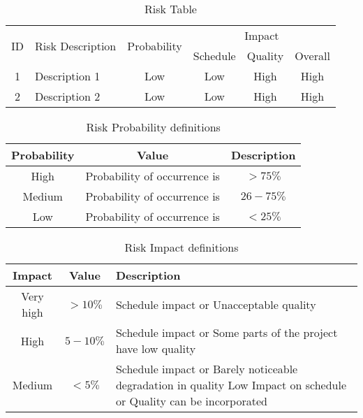 \documentclass[oneside,a4paper,12pt]{report}
\begin{document}
\begin{table}[!htbp]
\begin{center}
\def\arraystretch{1.5}
\begin{tabularx}{\textwidth}{| c | X | c | c | c | c |}
\hline
\multirow{2}{*}{ID} & \multirow{2}{*}{Risk Description}	& \multirow{2}{*}{Probability} & \multicolumn{3}{|c|}{Impact} \\ \cline{4-6}
	& & &	Schedule	& Quality	& Overall \\ \hline
1	& Description 1	& Low	& Low	& High	& High \\ \hline
2	& Description 2	& Low	& Low	& High	& High \\ \hline
\end{tabularx}
\end{center}
\caption{Risk Table}
\label{tab:risk}
\end{table}


\begin{table}[!htbp]
\begin{center}
\def\arraystretch{1.5}
\begin{tabular}{| c | c | c |}
\hline
Probability & Value &	Description \\ \hline
High &	Probability of occurrence is &  $ > 75 \% $ \\ \hline
Medium &	Probability of occurrence is  & $26-75 \% $ \\ \hline
Low	& Probability of occurrence is & $ < 25 \% $ \\ \hline
\end{tabular}
\end{center}
\caption{Risk Probability definitions \cite{bookPressman}}
\label{tab:riskdef}
\end{table}

\begin{table}[!htbp]
\begin{center}
\def\arraystretch{1.5}
\begin{tabularx}{\textwidth}{| c | c | X |}
\hline
Impact & Value	& Description \\ \hline
Very high &	$> 10 \%$ & Schedule impact or Unacceptable quality \\ \hline
High &	$5-10 \%$ & Schedule impact or Some parts of the project have low quality \\ \hline
Medium	& $ < 5 \% $ & Schedule impact or Barely noticeable degradation in quality Low	Impact on schedule or Quality can be incorporated \\ \hline
\end{tabularx}
\end{center}
\caption{Risk Impact definitions \cite{bookPressman}}
\label{tab:riskImpactDef}
\end{table}
\end{document}

